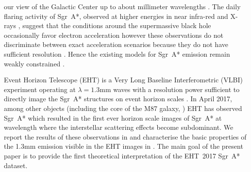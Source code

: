 our view of the Galactic Center up to about millimeter wavelengths \citep{2016ApJ...824...40O,2019A&A...621A.119B}. The daily flaring activity of Sgr~A*, observed at higher energies in near infra-red and X-rays \citep{2009ApJ...698..676D,2019ApJ...886...96H}, suggest that the conditions around the supermassive black hole occasionally favor electron acceleration however these observations do not discriminate between exact acceleration scenarios because they do not have sufficient resolution \citep{2000ApJ...541..234O}. Hence the existing models for Sgr~A* emission remain weakly constrained \citep[e.g.,][]{2005ApJ...621..785G,2006MNRAS.370..219M,
  2007A&A...474....1M, 2007MNRAS.379.1519M, 2009A&A...508L..13M,
  2009ApJ...701..521C, 2009ApJ...706..497M, 2012ApJ...746L..10D,
  2012MNRAS.421.1315Z, 2013A&A...559L...3M, 2014A&A...570A...7M,
  2014ApJ...790....1B, 2015ApJ...799....1C, 2015ApJ...802...69B,
  2015ApJ...812..103C, 2015Sci...350.1242J, 2016A&A...588A..57F,
  2016ApJ...826...77B, 2016ApJ...831....4P, 2016MNRAS.455.2187M,
  2017ApJ...837..180G, 2017ApJ...844...35M, 2017ApJ...851..148M,
  2017MNRAS.467.3604R, 2018A&A...612A..34D, 2018ApJ...856..163M,
  2018ApJ...859...60L, 2018ApJ...863..148P, 2018ApJ...865..104J,
  2018ApJ...868..101B, 2018JCAP...07..015H, 2018MNRAS.478.1875J,
  2018MNRAS.478.5209C, 2019ApJ...881L...2B, 2019ApJ...884..148B,
  2020ApJ...896L...6R, 2020ApJ...897...99T, 2020MNRAS.492.3272R,
  2020MNRAS.493.1404A, 2020MNRAS.494.4168D, 2020MNRAS.494.5923P,
  2020MNRAS.497.4999D, 2020ApJ...896L...6R, 2021ApJ...917....8B,
  2021MNRAS.502.2023P}.

Event Horizon Telescope (EHT) is a Very Long Baseline Interferometric (VLBI) experiment operating at $\lambda=1.3$mm waves with a resolution power sufficient to directly image the Sgr~A* structures on event horizon scales \citep{x}. 
In April 2017, among other objects (including the core of the M87 galaxy, ) EHT has observed Sgr~A* which resulted in the first ever horizon scale images of Sgr~A* at wavelength where the interstellar scattering effects become subdominant. We report the results of these observations in  and characterise the basic properties of the 1.3mm emission visible in the EHT images in . The main goal of the present paper  is to provide the first theoretical interpretation of the EHT~2017 Sgr~A* dataset.

